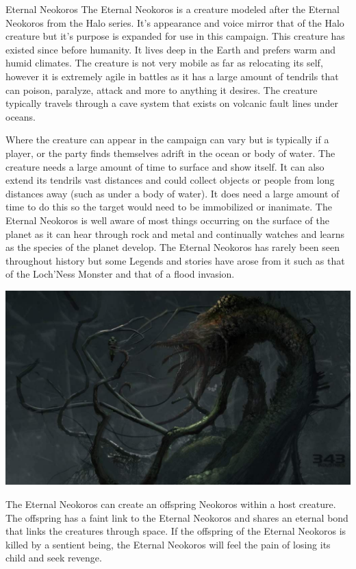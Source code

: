 \begin{commentbox}{Eternal Neokoros}	
	The Eternal Neokoros is a creature modeled after the Eternal Neokoros from the Halo series. It's appearance and voice mirror that of the Halo creature but it's purpose is expanded for use in this campaign. This creature has existed since before humanity. It lives deep in the Earth and prefers warm and humid climates. The creature is not very mobile as far as relocating its self, however it is extremely agile in battles as it has a large amount of tendrils that can poison, paralyze, attack and more to anything it desires. The creature typically travels through a cave system that exists on volcanic fault lines under oceans. 
	
	Where the creature can appear in the campaign can vary but is typically if a player, or the party finds themselves adrift in the ocean or body of water. The creature needs a large amount of time to surface and show itself. It can also extend its tendrils vast distances and could collect objects or people from long distances away (such as under a body of water). It does need a large amount of time to do this so the target would need to be immobilized or inanimate. The Eternal Neokoros is well aware of most things occurring on the surface of the planet as it can hear through rock and metal and continually watches and learns as the species of the planet develop. The Eternal Neokoros has rarely been seen throughout history but some Legends and stories have arose from it such as that of the Loch'Ness Monster and that of a flood invasion.
	
	\begin{center}
		\includegraphics[width=0.6\linewidth]{img/gravemind.jpg}
	\end{center}

	The Eternal Neokoros can create an offspring Neokoros within a host creature. The offspring has a faint link to the Eternal Neokoros and shares an eternal bond that links the creatures through space. If the offspring of the Eternal Neokoros is killed by a sentient being, the Eternal Neokoros will feel the pain of losing its child and seek revenge.
\end{commentbox}

